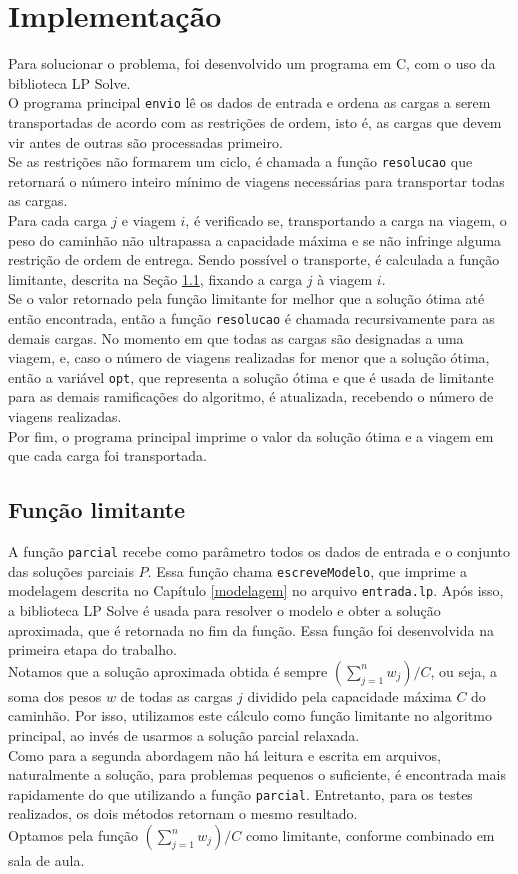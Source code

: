 \documentclass{article}
\begin{document}
\section{Implementação}
Para solucionar o problema, foi desenvolvido um programa em C, com o uso da biblioteca LP Solve.\\
O programa principal \texttt{envio} lê os dados de entrada e ordena as cargas a serem transportadas de acordo com as restrições de ordem, isto é, as cargas que devem vir antes de outras são processadas primeiro.\\
Se as restrições não formarem um ciclo, é chamada a função \texttt{resolucao} que retornará o número inteiro mínimo de viagens necessárias para transportar todas as cargas.\\
Para cada carga $j$ e viagem $i$, é verificado se, transportando a carga na viagem, o peso do caminhão não ultrapassa a capacidade máxima e se não infringe alguma restrição de ordem de entrega. Sendo possível o transporte, é calculada a função limitante, descrita na Seção \ref{parcial}, fixando a carga $j$ à viagem $i$.\\
Se o valor retornado pela função limitante for melhor que a solução ótima até então encontrada, então a função \texttt{resolucao} é chamada recursivamente para as demais cargas. No momento em que todas as cargas são designadas a uma viagem, e, caso o número de viagens realizadas for menor que a solução ótima, então a variável \texttt{opt}, que representa a solução ótima e que é usada de limitante para as demais ramificações do algoritmo, é atualizada, recebendo o número de viagens realizadas.\\
Por fim, o programa principal imprime o valor da solução ótima e a viagem em que cada carga foi transportada.\\

\subsection{Função limitante} \label{parcial}
A função \texttt{parcial} recebe como parâmetro todos os dados de entrada e o conjunto das soluções parciais $P$. Essa função chama \texttt{escreveModelo}, que imprime a modelagem descrita no Capítulo \ref{modelagem} no arquivo \texttt{entrada.lp}. Após isso, a biblioteca LP Solve é usada para resolver o modelo e obter a solução aproximada, que é retornada no fim da função. Essa função foi desenvolvida na primeira etapa do trabalho.\\
Notamos que a solução aproximada obtida é sempre $(\sum_{j=1}^n w_j)/C$, ou seja, a soma dos pesos $w$ de todas as cargas $j$ dividido pela capacidade máxima $C$ do caminhão. Por isso, utilizamos este cálculo como função limitante no algoritmo principal, ao invés de usarmos a solução parcial relaxada.\\
Como para a segunda abordagem não há leitura e escrita em arquivos, naturalmente a solução, para problemas pequenos o suficiente, é encontrada mais rapidamente do que utilizando a função \texttt{parcial}. Entretanto, para os testes realizados, os dois métodos retornam o mesmo resultado.\\
Optamos pela função $(\sum_{j=1}^n w_j)/C$ como limitante, conforme combinado em sala de aula.
\end{document}
